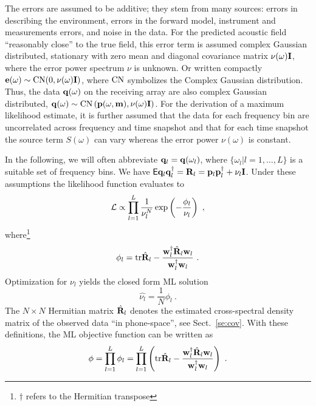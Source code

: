 \documentclass{saclantc}
\newcommand{\E}{{\sf E}}
\begin{document}
The errors are  assumed to be additive;  they
 stem from many sources: errors in describing the
environment, errors in the forward model, instrument and
measurements errors, and noise in the data.  For the predicted
acoustic field
``reasonably close'' to the true field, this error term is
assumed complex Gaussian distributed, stationary
 with zero mean and diagonal covariance matrix
$\nu (\omega ){\bf I}$, where the error  power spectrum $\nu $ is unknown.
Or written compactly ${\bf e}(\omega) \sim {\rm CN}(0,{\nu (\omega
){\bf I}})$, where $ {\rm CN}$ symbolizes the Complex Gaussian distribution.
 Thus, the data ${\bf q}(\omega)$ on the receiving array are also 
complex Gaussian distributed,
${\bf q}(\omega) \sim {\rm CN}\left({\bf p}(\omega,{\bf m}),
                   \nu (\omega){\bf I}\right)$. 
For the derivation of a maximum likelihood estimate, it is further
assumed that the data for each frequency bin are uncorrelated across
frequency and time snapshot and that for each time snapshot the source term
$S( \omega)$ can vary whereas the error power $\nu (\omega )$ is constant.


In the following, we will often abbreviate
${\bf q}_l={\bf q}(\omega_l)$, where 
$\{ \omega_l| l=1,\ldots,L\} $ is a suitable set of frequency bins.
We have $\E {\bf q}_l{\bf q}_l^\dagger = 
  {\bf R}_l = {\bf p}_l{\bf p}_l^{\dagger} + \nu_l{\bf I}$.
Under these assumptions the  likelihood  function 
evaluates to
\begin{equation}
 {\cal L} \propto \prod_{l=1}^{L} \frac{1}{\nu_l^N}
      \exp \left(-\frac{\phi_l}{\nu_l} \right)~,
\end{equation}
where\footnote{$\dagger$ refers to the Hermitian transpose}
\begin{equation}
\phi_l= \mbox{tr} \hat{\bf R}_l- 
\frac{{\bf w}_l^\dagger \hat{\bf R}_l{\bf w}_l}
      {{\bf w}_l^\dagger {\bf w}_l}~.
\label{eq:ml}
\end{equation}
Optimization for $\nu_l$ yields the closed form ML solution
\begin{equation}
\hat{\nu_l}= \frac{1}{N} \phi_l^{}~.
 \label{eq:mlnoise}
\end{equation}
The $N\times N$ Hermitian matrix $\hat{\bf R}_l$ denotes the estimated
cross-spectral density matrix of the observed data ``in phone-space'', 
see Sect.~\ref{se:cov}. With these definitions,
the ML objective function can be written as
\begin{equation} 
 \phi=\prod^L_{l=1} \phi_l= 
 \prod^L_{l=1}\left( \mbox{tr} \hat{\bf R}_l- 
\frac{{\bf w}_l^\dagger \hat{\bf R}_l{\bf w}_l}
      {{\bf w}_l^\dagger {\bf w}_l} \right) ~.
\label{eq:mfp}
\end{equation}
\end{document}
